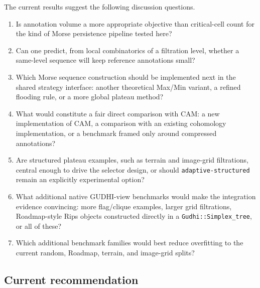\documentclass[11pt]{article}
\begin{document}
The current results suggest the following discussion questions.
\begin{enumerate}
  \item Is annotation volume a more appropriate objective than critical-cell count for the
        kind of Morse persistence pipeline tested here?
  \item Can one predict, from local combinatorics of a filtration level, whether a
        same-level sequence will keep reference annotations small?
  \item Which Morse sequence construction should be implemented next in the shared
        strategy interface: another theoretical Max/Min variant, a refined flooding rule,
        or a more global plateau method?
  \item What would constitute a fair direct comparison with CAM: a new implementation of
        CAM, a comparison with an existing cohomology implementation, or a benchmark framed
        only around compressed annotations?
  \item Are structured plateau examples, such as terrain and image-grid filtrations,
        central enough to drive the selector design, or should
        \texttt{adaptive-structured} remain an explicitly experimental option?
  \item What additional native GUDHI-view benchmarks would make the integration evidence
        convincing: more flag/clique examples, larger grid filtrations, Roadmap-style Rips
        objects constructed directly in a \texttt{Gudhi::Simplex\_tree}, or all of these?
  \item Which additional benchmark families would best reduce overfitting to the current
        random, Roadmap, terrain, and image-grid splits?
\end{enumerate}

\subsection{Current recommendation}
\end{document}
